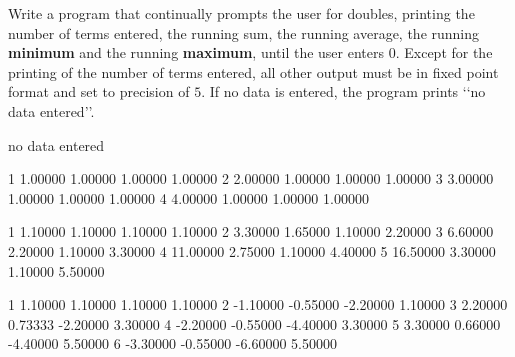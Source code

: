 Write a program that continually prompts the user for doubles, printing the
number of terms entered, the running sum, the running average, the running
\textbf{minimum} and the running \textbf{maximum}, until the user enters $0$.
Except for the printing of the number of terms entered, all other output must
be in fixed point format and set to precision of $5$. If no data is entered,
the program prints \lq\lq no data entered\rq\rq.

\resett
\nextt
\begin{console}[commandchars=\\\{\}]
no data entered
\end{console}

\nextt
\begin{console}[commandchars=\\\{\}]
1 1.00000 1.00000 1.00000 1.00000
2 2.00000 1.00000 1.00000 1.00000
3 3.00000 1.00000 1.00000 1.00000
4 4.00000 1.00000 1.00000 1.00000
\end{console}

\nextt
\begin{console}[commandchars=\\\{\}]
1 1.10000 1.10000 1.10000 1.10000
2 3.30000 1.65000 1.10000 2.20000
3 6.60000 2.20000 1.10000 3.30000
4 11.00000 2.75000 1.10000 4.40000
5 16.50000 3.30000 1.10000 5.50000
\end{console}

\nextt
\begin{console}[commandchars=\\\{\}]
1 1.10000 1.10000 1.10000 1.10000
2 -1.10000 -0.55000 -2.20000 1.10000
3 2.20000 0.73333 -2.20000 3.30000
4 -2.20000 -0.55000 -4.40000 3.30000
5 3.30000 0.66000 -4.40000 5.50000
6 -3.30000 -0.55000 -6.60000 5.50000
\end{console}
